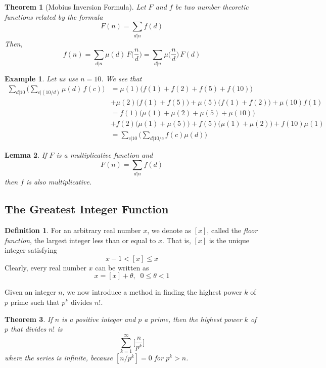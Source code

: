\documentclass{article}
\newtheorem{theorem}{Theorem}[section]
\newtheorem{lemma}[theorem]{Lemma}
\newtheorem{example}{Example}[section]
\theoremstyle{remark}
\theoremstyle{definition}
\newtheorem{definition}{Definition}[section]
\begin{document}
\begin{theorem}[Mobius Inversion Formula]
Let $F$ and $f$ be two number theoretic functions related by the formula
\[F(n) = \sum_{d|n} f(d)\]
Then,
\[f(n) = \sum_{d|n} \mu(d)\, F \Big(\frac{n}{d} \Big) = \sum_{d|n} \mu \Big( \frac{n}{d} \Big) \, F(d)\]
\end{theorem}

\begin{example}
Let us use $n=10$. We see that
\begin{align*}
    \sum_{d|10} \bigg( \sum_{c|(10/d)} \mu(d) \, f(c) \bigg) & = \mu(1) \big( f(1) + f(2) + f(5) + f(10)\big)  \\
    & + \mu(2) \big( f(1) + f(5)\big) + \mu(5) \big( f(1) + f(2) \big) + \mu(10) f(1) \\
    & = f(1) \big( \mu(1) + \mu(2) + \mu(5) + \mu(10)\big) \\
    & + f(2) \big(\mu(1) + \mu(5) \big) + f(5) \big( \mu(1) + \mu(2) \big) + f(10) \mu(1) \\
    & = \sum_{c|10} \bigg( \sum_{d|10/c} f(c) \mu(d) \bigg)
\end{align*}
\end{example}

\begin{lemma}
If $F$ is a multiplicative function and 
\[F(n) = \sum_{d|n} f(d)\]
then $f$ is also multiplicative. 
\end{lemma}

\subsection{The Greatest Integer Function}

\begin{definition}
For an arbitrary real number $x$, we denote as $[x]$, called the \textit{floor function}, the largest integer less than or equal to $x$. That is, $[x]$ is the unique integer satisfying
\[x-1 < [x] \leq x\]
Clearly, every real number $x$ can be written as
\[x = [x] + \theta, \;\; 0 \leq \theta < 1 \]
\end{definition}

Given an integer $n$, we now introduce a method in finding the highest power $k$ of $p$ prime such that $p^k$ divides $n!$. 

\begin{theorem}
If $n$ is a positive integer and $p$ a prime, then the highest power $k$ of $p$ that divides $n!$ is 
\[\sum_{k=1}^\infty \bigg[ \frac{n}{p^k} \bigg]\]
where the series is infinite, because $[n/p^k] = 0$ for $p^k > n$. 
\end{theorem}
\end{document}
